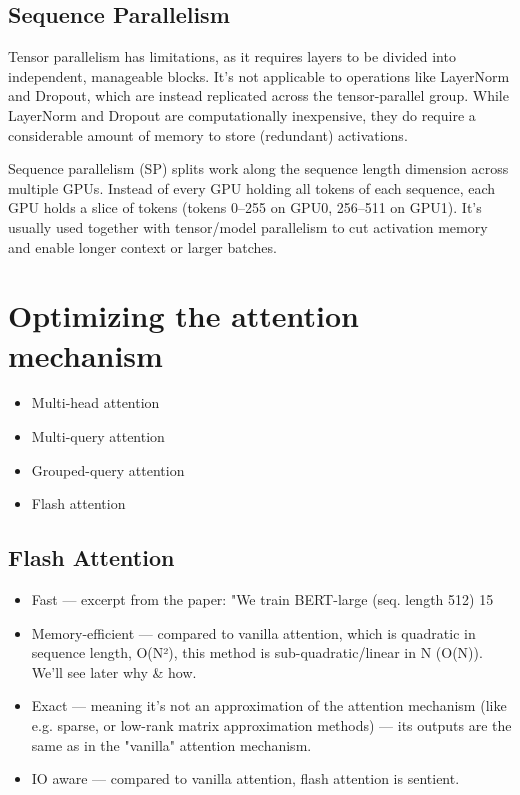 \subsection{Sequence Parallelism}

Tensor parallelism has limitations, as it requires layers to be divided into independent, manageable blocks. It's not applicable to operations like LayerNorm and Dropout, which are instead replicated across the tensor-parallel group. While LayerNorm and Dropout are computationally inexpensive, they do require a considerable amount of memory to store (redundant) activations.

Sequence parallelism (SP) splits work along the sequence length dimension across multiple GPUs. Instead of every GPU holding all tokens of each sequence, each GPU holds a slice of tokens (\eg tokens 0–255 on GPU0, 256–511 on GPU1). It's usually used together with tensor/model parallelism to cut activation memory and enable longer context or larger batches.



\section{Optimizing the attention mechanism}

\begin{itemize}
	\item Multi-head attention
	\item Multi-query attention
	\item Grouped-query attention
	\item Flash attention
\end{itemize}


\subsection{Flash Attention}

\begin{itemize}
	\item    Fast — excerpt from the paper: "We train BERT-large (seq. length 512) 15%
	\item    Memory-efficient — compared to vanilla attention, which is quadratic in sequence length, O(N²), this method is sub-quadratic/linear in N (O(N)). We'll see later why & how.
	\item    Exact — meaning it's not an approximation of the attention mechanism (like e.g. sparse, or low-rank matrix approximation methods) — its outputs are the same as in the "vanilla" attention mechanism.
	\item    IO aware — compared to vanilla attention, flash attention is sentient.
\end{itemize}


